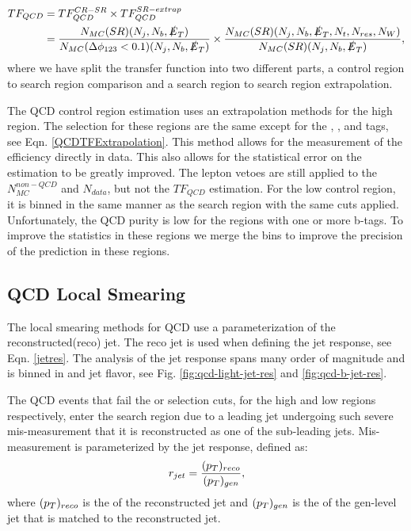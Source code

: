 \begin{equation}\label{QCDTFExtrapolation}
\begin{split}
TF_{QCD}&=TF_{QCD}^{CR-SR}\times TF_{QCD}^{SR-extrap} \\
&=\frac{N_{MC}(SR)(N_{j},N_{b},\slashed{E}_{T})}{N_{MC}(\Delta\phi_{123}<0.1)(N_{j},N_{b},\slashed{E}_{T})}\times\frac{N_{MC}(SR)(N_{j},N_{b},\slashed{E}_{T},N_{t},N_{res},N_{W})}{N_{MC}(SR)(N_{j},N_{b},\slashed{E}_{T})},
\end{split}
\end{equation}
where we have split the transfer function into two different parts, a control region to search region comparison and a search region to search region extrapolation.

The QCD control region estimation uses an extrapolation methods for the high \dm{} region. The selection for these regions are the same except for the \nt, \nrt, and \nw{} tags, see Eqn. \ref{QCDTFExtrapolation}. This method allows for the measurement of the efficiency directly in data. This also allows for the statistical error on the estimation to be greatly improved. The lepton vetoes are still applied to the $N_{MC}^{non-QCD}$ and $N_{data}$, but not the $TF_{QCD}$ estimation. For the low \dm{} control region, it is binned in the same manner as the search region with the same cuts applied. Unfortunately, the QCD purity is low for the regions with one or more b-tags. To improve the statistics in these regions we merge the \met{} bins to improve the precision of the prediction in these regions. 

\subsection{QCD Local Smearing}\label{Smearing}

The local smearing methods for QCD use a parameterization of the reconstructed(reco) jet. The reco jet is used when defining the jet response, see Eqn. \ref{jetres}. The analysis of the jet response spans many order of magnitude and is binned in \pt{} and jet flavor, see Fig. \ref{fig:qcd-light-jet-res} and \ref{fig:qcd-b-jet-res}. 

The QCD events that fail the \highdm{} or \lowdm{} selection cuts, for the high and low \dm{} regions respectively, enter the search region due to a leading jet undergoing such severe mis-measurement that it is reconstructed as one of the sub-leading jets. Mis-measurement is parameterized by the jet response, defined as:
\begin{equation}\label{jetres}
r_{jet}=\frac{(p_{T})_{reco}}{(p_{T})_{gen}},
\end{equation}
where $(p_{T})_{reco}$ is the \pt{} of the reconstructed jet and $(p_{T})_{gen}$ is the \pt{} of the gen-level jet that is matched to the reconstructed jet.

